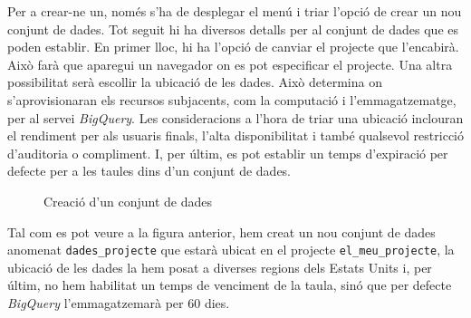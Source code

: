 \documentclass[12pt,longbibliography]{article}
\theoremstyle{definition}
\theoremstyle{remark}
\begin{document}
\vspace{2mm}

Per a crear-ne un, només s'ha de desplegar el menú i triar l'opció de crear un nou conjunt de dades. Tot seguit hi ha diversos detalls per al conjunt de dades que es poden establir. En primer lloc, hi ha l'opció de canviar el projecte que l'encabirà. Això farà que aparegui un navegador on es pot especificar el projecte. Una altra possibilitat serà escollir la ubicació de les dades. Això determina on s'aprovisionaran els recursos subjacents, com la computació i l'emmagatzematge, per al servei \textit{BigQuery}. Les consideracions a l'hora de triar una ubicació inclouran el rendiment per als usuaris finals, l'alta disponibilitat i també qualsevol restricció d'auditoria o compliment. I, per últim, es pot establir un temps d'expiració per defecte per a les taules dins d'un conjunt de dades.

\vspace{2mm}
\begin{figure}[h!]
\par
{}%
\hfill
{}%
\par
\caption{Creació d'un conjunt de dades}
\label{fig:bq3}
\end{figure}
\vspace{2mm}

Tal com es pot veure a la figura anterior, hem creat un nou conjunt de dades anomenat \verb|dades_projecte| que estarà ubicat en el projecte \verb|el_meu_projecte|, la ubicació de les dades la hem posat a diverses regions dels Estats Units i, per últim, no hem habilitat un temps de venciment de la taula, sinó que per defecte \textit{BigQuery} l'emmagatzemarà per 60 dies.
\end{document}
